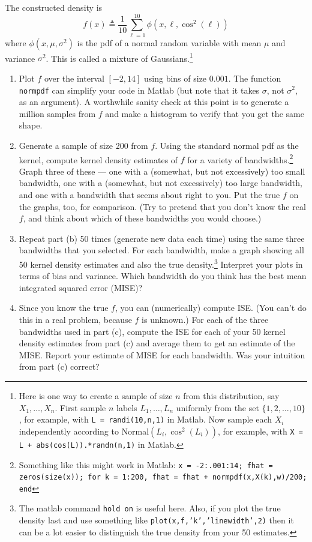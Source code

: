\documentclass[11pt]{report}
\newcommand{\teq}{\triangleq}
\begin{document}
\begin{enumerate}[1.]
          The constructed density is
          \[ f(x) \teq \frac{1}{10}\sum_{\ell=1}^{10} \phi(x,\ell,\cos^2(\ell)) \]
          where $\phi(x,\mu,\sigma^2)$ is the pdf of a normal random variable with mean $\mu$ and variance $\sigma^2$.  This is called a mixture of Gaussians.\footnote{ Here is one way to create a sample of size $n$ from this distribution, say $X_1,\dotsc,X_n$.  First sample $n$ labels $L_1,\dotsc,L_n$ uniformly from the set $\{1,2,\dotsc,10\}$, for example, with {\tt L = randi(10,n,1)} in Matlab.  Now sample each $X_i$ independently according to Normal$(L_i,\cos^2(L_i))$, for example, with {\tt X = L + abs(cos(L)).*randn(n,1)} in Matlab.}
          \begin{enumerate}
              \item Plot $f$ over the interval $[-2,14]$ using bins of size $0.001$.  The function {\tt normpdf} can simplify your code in Matlab (but note that it takes $\sigma$, not $\sigma^2$, as an argument).  A worthwhile sanity check at this point is to generate a million samples from $f$ and make a histogram to verify that you get the same shape.
              \item
                    Generate a sample of size 200 from $f$.  Using the standard normal pdf as the kernel, compute kernel density estimates of $f$ for a variety of bandwidths.\footnote{Something like this might work in Matlab: {\tt x = -2:.001:14; fhat = zeros(size(x)); for k = 1:200, fhat = fhat + normpdf(x,X(k),w)/200; end}}  Graph three of these --- one with a (somewhat, but not excessively) too small bandwidth, one with a (somewhat, but not excessively) too large bandwidth, and one with a bandwidth that seems about right to you.  Put the true $f$ on the graphs, too, for comparison.  (Try to pretend that you don't know the real $f$, and think about which of these bandwidths you would choose.)
              \item Repeat part (b) 50 times (generate new data each time) using the same three bandwidths that you selected.  For each bandwidth, make a graph showing all 50 kernel density estimates and also the true density.\footnote{The matlab command {\tt hold on} is useful here.  Also, if you plot the true density last and use something like {\tt plot(x,f,'k','linewidth',2)} then it can be a lot easier to distinguish the true density from your 50 estimates.}  Interpret your plots in terms of bias and variance.  Which bandwidth do you think has the best mean integrated squared error (MISE)?
              \item Since you know the true $f$, you can (numerically) compute ISE. (You can't do this in a real problem, because $f$ is unknown.) For each of the three bandwidths used in part (c), compute the ISE for each of your 50 kernel density estimates from part (c) and average them to get an estimate of the MISE. Report your estimate of MISE for each bandwidth. Was your intuition from part (c) correct?

\end{enumerate}
\end{enumerate}
\end{document}
